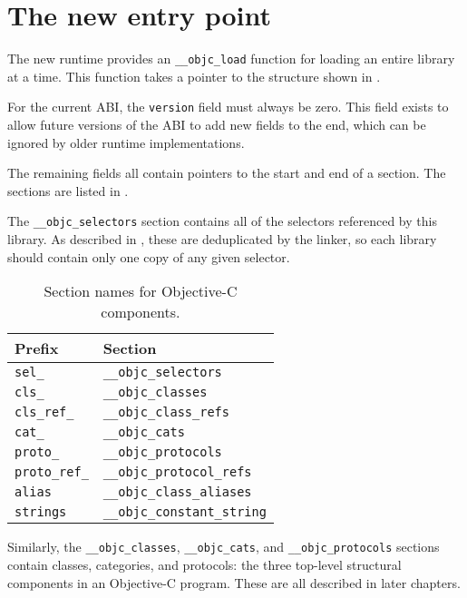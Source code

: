 \documentclass[a4paper]{report}
\newcommand{\ccode}[1]{\lstinline[language={C}]{#1}}
\newcommand{\inccode}[4]{
{
	 }}
	]{../#1}
}
}
\begin{document}
\section{The new entry point}

The new runtime provides an \ccode{__objc_load} function for loading an entire library at a time.
This function takes a pointer to the structure shown in .

For the current ABI, the \ccode{version} field must always be zero.
This field exists to allow future versions of the ABI to add new fields to the end, which can be ignored by older runtime implementations.

The remaining fields all contain pointers to the start and end of a section.
The sections are listed in .

\inccode{loader.c}{initobjc}{objc_init}{The Objective-C library description structure.}

The \ccode{__objc_selectors} section contains all of the selectors referenced by this library.
As described in , these are deduplicated by the linker, so each library should contain only one copy of any given selector.

\begin{table}
	\begin{center}
		\begin{tabular}{l|l}
			Prefix & Section \\\hline
			\ccode{sel_} & \ccode{__objc_selectors}\\
			\ccode{cls_} & \ccode{__objc_classes}\\
			\ccode{cls_ref_} & \ccode{__objc_class_refs}\\
			\ccode{cat_} & \ccode{__objc_cats}\\
			\ccode{proto_} & \ccode{__objc_protocols}\\
			\ccode{proto_ref_} & \ccode{__objc_protocol_refs}\\
			\ccode{alias} & \ccode{__objc_class_aliases}\\
			\ccode{strings} & \ccode{__objc_constant_string}
		\end{tabular}
		\caption{\label{tab:sections}Section names for Objective-C components.}
	\end{center}
\end{table}

Similarly, the \ccode{__objc_classes}, \ccode{__objc_cats}, and \ccode{__objc_protocols} sections contain classes, categories, and protocols: the three top-level structural components in an Objective-C program.
These are all described in later chapters.
\end{document}
